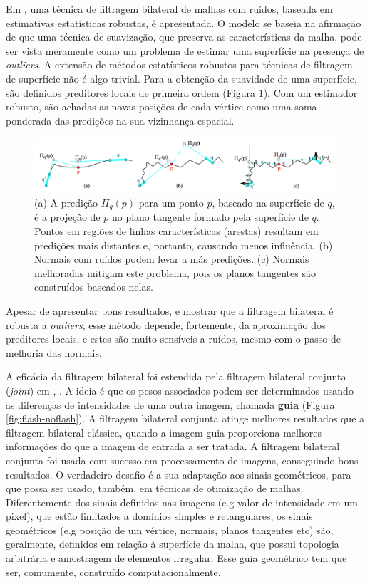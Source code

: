Em \cite{jones2003non}, uma técnica de filtragem bilateral de malhas com ruídos, baseada em estimativas estatísticas robustas, é apresentada. O modelo se baseia na afirmação de que uma técnica de suavização, que preserva as características da malha, pode ser vista meramente como um problema de estimar uma superfície na presença de \textit{outliers}. A extensão de métodos estatísticos robustos para técnicas de filtragem de superfície não é algo trivial. Para a obtenção da suavidade de uma superfície, são definidos preditores locais de primeira ordem (Figura \ref{fig:predictions}). Com um estimador robusto, são achadas as novas posições de cada vértice como uma soma ponderada das predições na sua vizinhança espacial.


\begin{figure}[!h]
\captionsetup{width=\linewidth}
\centering
\includegraphics[scale=0.28]{figuras/predictions.png}
\caption{(a) A predição $\Pi_q(p)$ para um ponto $p$, baseado na superfície de $q$, é a projeção de $p$ no plano tangente formado pela superfície de $q$. Pontos em regiões de linhas características (arestas) resultam em predições mais distantes e, portanto, causando menos influência. (b) Normais com ruídos podem levar a más predições. (c) Normais melhoradas mitigam este problema, pois os planos tangentes são construídos baseados nelas. }
\label{fig:predictions}
\end{figure}

Apesar de apresentar bons resultados, e mostrar que a filtragem bilateral é robusta a \textit{outliers}, esse método depende, fortemente, da aproximação dos preditores locais, e estes são muito sensíveis a ruídos, mesmo com o passo de melhoria das normais. 

A eficácia da filtragem bilateral foi estendida pela filtragem bilateral conjunta (\textit{joint}) em \cite{eisemann2004flash}, \cite{petschnigg2004digital}. A ideia é que os pesos associados podem ser determinados usando as diferenças de intensidades de uma outra imagem, chamada \textbf{guia} (Figura \ref{fig:flash-noflash}). A filtragem bilateral conjunta atinge melhores resultados que a filtragem bilateral clássica, quando a imagem guia proporciona melhores informações do que a imagem de entrada a ser tratada. A filtragem bilateral conjunta foi usada com sucesso em processamento de imagens, conseguindo bons resultados. O verdadeiro desafio é a sua adaptação aos sinais geométricos, para que possa ser usado, também, em técnicas de otimização de malhas. Diferentemente dos sinais definidos nas imagens (e.g valor de intensidade em um pixel), que estão limitados a domínios simples e retangulares, os sinais geométricos (e.g posição de um vértice, normais, planos tangentes etc) são, geralmente, definidos em relação à superfície da malha, que possui topologia arbitrária e amostragem de elementos irregular. Esse guia geométrico tem que ser, comumente, construído computacionalmente.

